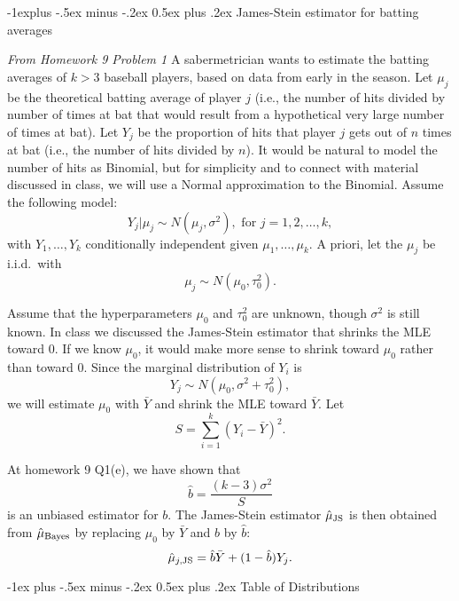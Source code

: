 \documentclass[10pt,landscape]{article}
\makeatletter
\renewcommand{\section}{\@startsection{section}{1}{0mm}%
                                {-1ex plus -.5ex minus -.2ex}%
                                {0.5ex plus .2ex}%
                                {\normalfont\large\bfseries}}
\renewcommand{\subsection}{\@startsection{subsection}{2}{0mm}%
                                {-1explus -.5ex minus -.2ex}%
                                {0.5ex plus .2ex}%
                                {\normalfont\normalsize\bfseries}}
\makeatother
\begin{document}
\begin{multicols*}{3}
\subsection{ James-Stein estimator for batting averages}

\textit{From Homework 9 Problem 1}
 A sabermetrician wants to estimate the batting averages of $k > 3$ baseball players, based on data from early in the season. Let $\mu_j$ be the theoretical batting average of player $j$ (i.e., the number of hits divided by number of times at bat that would result from a hypothetical very large number of times at bat).  Let $Y_j$ be the proportion of hits that player $j$ gets out of $n$ times at bat (i.e., the number of hits divided by $n$). It would be natural to model the number of hits as Binomial, but for simplicity and to connect with material discussed in class, we will use a Normal approximation to the Binomial. Assume the following model:
$$Y_j | \mu_j \sim N(\mu_j,\sigma^2), \text{ for } j = 1,2, \dots, k,$$
with $Y_1,\dots,Y_k$ conditionally independent given $\mu_1,\dots,\mu_k$. A priori, let the $\mu_j$ be i.i.d.~with
$$\mu_j \sim N(\mu_0,\tau^2_0).$$


Assume that the hyperparameters $\mu_0$ and $\tau^2_0$ are unknown, though $\sigma^2$ is still known. In class we discussed the James-Stein estimator that shrinks the MLE toward $0$. If we know $\mu_0$, it would make more sense to shrink toward $\mu_0$ rather than toward $0$. Since the marginal distribution of $Y_i$ is
$$Y_j \sim N(\mu_0, \sigma^2 + \tau^2_0),$$
we will estimate  $\mu_0$  with $\bar{Y}$ and shrink the MLE toward $\bar{Y}$. Let
$$S = \sum_{i=1}^k (Y_i - \bar{Y})^2.$$

At homework 9 Q1(e), we have shown that
$$\hat{b} = \frac{(k-3)\sigma^2}{S}$$
is an unbiased estimator for $b$. The James-Stein estimator $\hat{\mu}_{\textnormal{JS}}$ is then obtained from $\hat{\mu}_{\textnormal{Bayes}}$ by replacing $\mu_0$ by $\bar{Y}$ and $b$ by $\hat{b}$:
$$\hat{\mu}_{j, \textnormal{JS}} = \hat{b} \bar{Y} + (1 - \hat{b}) Y_j.$$

\end{multicols*}

\section{Table of Distributions} 
\end{document}
